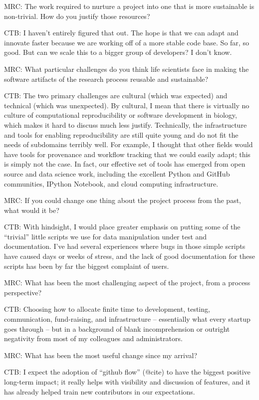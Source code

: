 \documentclass[11pt]{article}
\begin{document}
MRC: The work required to nurture a project into one that is more
sustainable is non-trivial. How do you justify those resources?

CTB: I haven't entirely figured that out.  The hope is that we can
adapt and innovate faster because we are working off of a more
stable code base.  So far, so good.  But can we scale this to a bigger
group of developers?  I don't know.

MRC: What particular challenges do you think life scientists face in
making the software artifacts of the research process reusable and
sustainable?

CTB: The two primary challenges are cultural (which was expected) and
technical (which was unexpected).  By cultural, I mean that there is
virtually no culture of computational reproducibility or software
development in biology, which makes it hard to discuss much less
justify.  Technically, the infrastructure and tools for enabling
reproducibility are still quite young and do not fit the needs of
subdomains terribly well.  For example, I thought that other fields
would have tools for provenance and workflow tracking that we could
easily adapt; this is simply not the case.  In fact, our effective set
of tools has emerged from open source and data science work, including
the excellent Python and GitHub communities, IPython Notebook, and
cloud computing infrastructure.

MRC: If you could change one thing about the project process from the
past, what would it be?

CTB: With hindsight, I would place greater emphasis on putting some of
the ``trivial'' little scripts we use for data manipulation under test
and documentation.  I've had several experiences where bugs in those
simple scripts have caused days or weeks of stress, and the lack of
good documentation for these scripts has been by far the biggest
complaint of users.

MRC: What has been the most challenging aspect of the project, from a
process perspective?

CTB: Choosing how to allocate finite time to development, testing,
communication, fund-raising, and infrastructure -- essentially what
every startup goes through -- but in a background of blank
incomprehension or outright negativity from most of my colleagues
and administrators.

MRC: What has been the most useful change since my arrival?

CTB: I expect the adoption of ``github flow'' (@cite) to have the biggest
positive long-term impact; it really helps with visibility and discussion
of features, and it has already helped train new contributors in our
expectations.
\end{document}
